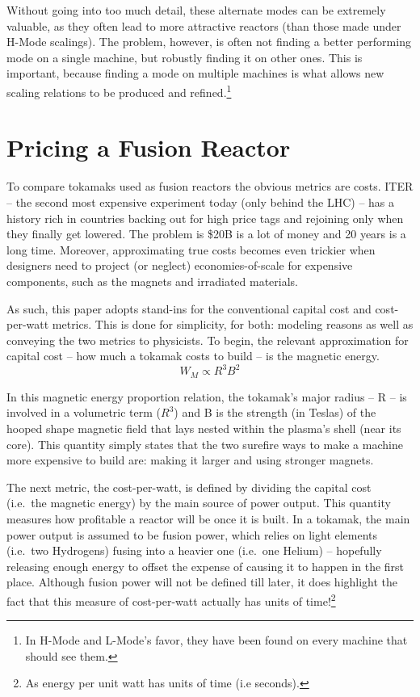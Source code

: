 Without going into too much detail, these alternate modes can be extremely valuable, as they often lead to more attractive reactors (than those made under H-Mode scalings). The problem, however, is often not finding a better performing mode on a single machine, but robustly finding it on other ones. This is important, because finding a mode on multiple machines is what allows new scaling relations to be produced and refined.\footnote{ In H-Mode and L-Mode's favor, they have been found on every machine that should see them. }

\section{Pricing a Fusion Reactor}

To compare tokamaks used as fusion reactors the obvious metrics are costs. ITER -- the second most expensive experiment today (only behind the LHC) -- has a history rich in countries backing out for high price tags and rejoining only when they finally get lowered. \cite{jeff} The problem is \$20B is a lot of money and 20 years is a long time. Moreover, approximating true costs becomes even trickier when designers need to project (or neglect)  economies-of-scale for expensive components, such as the magnets and irradiated materials.

As such, this paper adopts stand-ins for the conventional capital cost and cost-per-watt metrics. This is done for simplicity, for both: modeling reasons as well as conveying the two metrics to physicists. To begin, the relevant approximation for capital cost -- how much a tokamak costs to build -- is the magnetic energy. \cite{griffiths}
\begin{equation}
	W_M \propto R^3 B^2
\end{equation}

In this magnetic energy proportion relation, the tokamak's major radius -- R -- is involved in a volumetric term ($R^3$) and B is the strength (in Teslas) of the hooped shape magnetic field that lays nested within the plasma's shell (near its core). This quantity simply states that the two surefire ways to make a machine more expensive to build are: making it larger and using stronger magnets.

The next metric, the cost-per-watt, is defined by dividing the capital cost (i.e.\ the magnetic energy) by the main source of power output. This quantity measures how profitable a reactor will be once it is built. In a tokamak, the main power output is assumed to be fusion power, which relies on light elements (i.e.\ two Hydrogens) fusing into a heavier one (i.e.\ one Helium) -- hopefully releasing enough energy to offset the expense of causing it to happen in the first place. Although fusion power will not be defined till later, it does highlight the fact that this measure of cost-per-watt actually has units of time!\footnote{As energy per unit watt has units of time (i.e seconds).}


